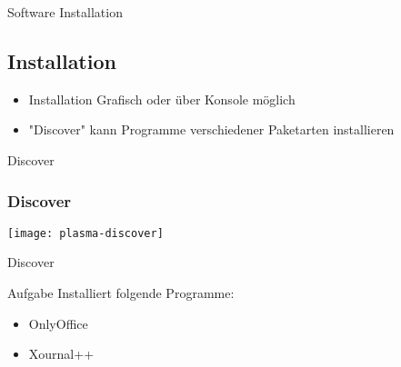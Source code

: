 \begin{frame}{Software Installation}
    \subsection{Installation}\label{subsec:installation}

    \begin{itemize}
        \item Installation Grafisch oder über Konsole möglich
        \item "Discover" kann Programme verschiedener Paketarten installieren
    \end{itemize}

\end{frame}

\begin{frame}{Discover}
    \subsubsection{Discover}\label{subsubsec:discover}

    \texttt{[image: plasma-discover]}
\end{frame}

\begin{frame}{Discover}

    \vspace{0.5cm}
    \begin{alertblock}{Aufgabe}
        Installiert folgende Programme:
        \begin{itemize}
            \item OnlyOffice
            \item Xournal++
        \end{itemize}
    \end{alertblock}

\end{frame}